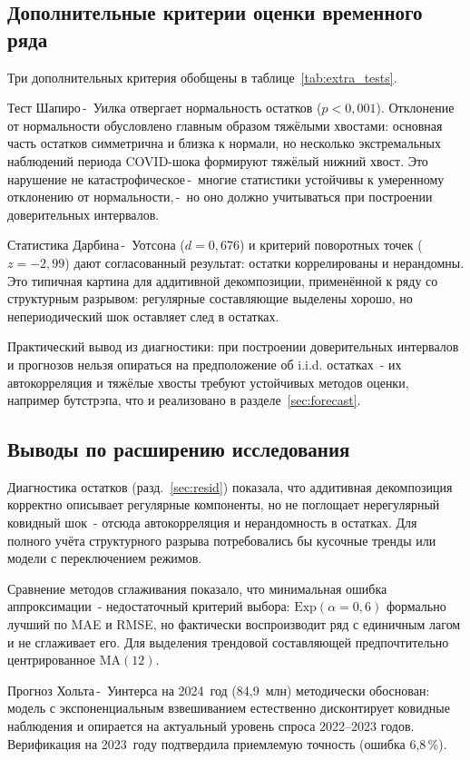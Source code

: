 \documentclass[a4paper,14pt]{extarticle}
\newcommand{\dash}{\,-~}
\begin{document}
\subsection{Дополнительные критерии оценки временного ряда}
Три дополнительных критерия обобщены в таблице~\ref{tab:extra_tests}.



Тест Шапиро\dash Уилка отвергает нормальность остатков
($p < 0{,}001$). Отклонение от нормальности обусловлено
главным образом тяжёлыми хвостами: основная часть остатков
симметрична и близка к нормали, но несколько экстремальных
наблюдений периода COVID-шока формируют тяжёлый нижний хвост.
Это нарушение не катастрофическое\dash многие статистики устойчивы
к умеренному отклонению от нормальности,\dash но оно
должно учитываться при построении доверительных интервалов.

Статистика Дарбина\dash Уотсона ($d = 0{,}676$) и критерий
поворотных точек ($z = -2{,}99$) дают согласованный результат:
остатки коррелированы и нерандомны. Это типичная картина
для аддитивной декомпозиции, применённой к ряду со структурным
разрывом: регулярные составляющие выделены хорошо, но
непериодический шок оставляет след в остатках.

Практический вывод из диагностики: при построении
доверительных интервалов и прогнозов нельзя опираться
на предположение об i.i.d. остатках~- их автокорреляция
и тяжёлые хвосты требуют устойчивых методов оценки,
например бутстрэпа, что и реализовано в разделе~\ref{sec:forecast}.

\subsection{Выводы по расширению исследования}
Диагностика остатков (разд.~\ref{sec:resid}) показала, что
аддитивная декомпозиция корректно описывает регулярные
компоненты, но не поглощает нерегулярный ковидный шок~-
отсюда автокорреляция и нерандомность в остатках.
Для полного учёта структурного разрыва потребовались бы
кусочные тренды или модели с переключением режимов.

Сравнение методов сглаживания показало, что минимальная
ошибка аппроксимации~- недостаточный критерий выбора:
$\mathrm{Exp}(\alpha=0{,}6)$ формально лучший по MAE и RMSE,
но фактически воспроизводит ряд с единичным лагом и не
сглаживает его. Для выделения трендовой составляющей
предпочтительно центрированное $\mathrm{MA}(12)$.

Прогноз Хольта\dash Уинтерса на 2024~год (84,9~млн)
методически обоснован: модель с экспоненциальным взвешиванием
естественно дисконтирует ковидные наблюдения и опирается на
актуальный уровень спроса 2022–2023 годов. Верификация на
2023~году подтвердила приемлемую точность (ошибка 6,8\,\%).
\end{document}

